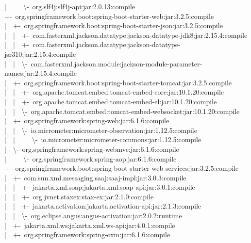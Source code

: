 |~~~~~\textbackslash-~org.slf4j:slf4j-api:jar:2.0.13:compile\\
+-~org.springframework.boot:spring-boot-starter-web:jar:3.2.5:compile\\
|~~+-~org.springframework.boot:spring-boot-starter-json:jar:3.2.5:compile\\
|~~|~~+-~com.fasterxml.jackson.datatype:jackson-datatype-jdk8:jar:2.15.4:compile\\
|~~|~~+-~com.fasterxml.jackson.datatype:jackson-datatype-jsr310:jar:2.15.4:compile\\
|~~|~~\textbackslash-~com.fasterxml.jackson.module:jackson-module-parameter-names:jar:2.15.4:compile\\
|~~+-~org.springframework.boot:spring-boot-starter-tomcat:jar:3.2.5:compile\\
|~~|~~+-~org.apache.tomcat.embed:tomcat-embed-core:jar:10.1.20:compile\\
|~~|~~+-~org.apache.tomcat.embed:tomcat-embed-el:jar:10.1.20:compile\\
|~~|~~\textbackslash-~org.apache.tomcat.embed:tomcat-embed-websocket:jar:10.1.20:compile\\
|~~+-~org.springframework:spring-web:jar:6.1.6:compile\\
|~~|~~\textbackslash-~io.micrometer:micrometer-observation:jar:1.12.5:compile\\
|~~|~~~~~\textbackslash-~io.micrometer:micrometer-commons:jar:1.12.5:compile\\
|~~\textbackslash-~org.springframework:spring-webmvc:jar:6.1.6:compile\\
|~~~~~\textbackslash-~org.springframework:spring-aop:jar:6.1.6:compile\\
+-~org.springframework.boot:spring-boot-starter-web-services:jar:3.2.5:compile\\
|~~+-~com.sun.xml.messaging.saaj:saaj-impl:jar:3.0.3:compile\\
|~~|~~+-~jakarta.xml.soap:jakarta.xml.soap-api:jar:3.0.1:compile\\
|~~|~~+-~org.jvnet.staxex:stax-ex:jar:2.1.0:compile\\
|~~|~~+-~jakarta.activation:jakarta.activation-api:jar:2.1.3:compile\\
|~~|~~\textbackslash-~org.eclipse.angus:angus-activation:jar:2.0.2:runtime\\
|~~+-~jakarta.xml.ws:jakarta.xml.ws-api:jar:4.0.1:compile\\
|~~+-~org.springframework:spring-oxm:jar:6.1.6:compile\\
